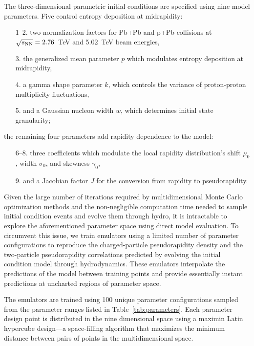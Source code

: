 The three-dimensional parametric initial conditions are specified using nine model parameters.
Five control entropy deposition at midrapidity:
\begin{itemize}[itemsep=0pt]
  \item[1--2.] two normalization factors for Pb+Pb and p+Pb collisions at $\sqrt{s_\mathrm{NN}}=2.76$~TeV and 5.02~TeV beam energies,
  \item[3.] the generalized mean parameter $p$ which modulates entropy deposition at midrapidity,
  \item[4.] a gamma shape parameter $k$, which controls the variance of proton-proton multiplicity fluctuations,
  \item[5.] and a Gaussian nucleon width $w$, which determines initial state granularity;
\end{itemize}
the remaining four parameters add rapidity dependence to the model:
\begin{itemize}[itemsep=0pt]
  \setcounter{enumi}{6}
  \item[6--8.] three coefficients which modulate the local rapidity distribution's shift $\mu_0$, width $\sigma_0$, and skewness $\gamma_0$,
  \item[9.] and a Jacobian factor $J$ for the conversion from rapidity to pseudorapidity.
\end{itemize}

Given the large number of iterations required by multidimensional Monte Carlo optimization methods and the non-negligible computation time needed to sample initial condition events and evolve them through hydro, it is intractable to explore the aforementioned parameter space using direct model evaluation.
To circumvent this issue, we train emulators using a limited number of parameter configurations to reproduce the charged-particle pseudorapidity density and the two-particle pseudorapidity correlations predicted by evolving the initial condition model through hydrodynamics.
These emulators interpolate the predictions of the model between training points and provide essentially instant predictions at uncharted regions of parameter space.

The emulators are trained using 100 unique parameter configurations sampled from the parameter ranges listed in Table~\ref{tab:parameters}.
Each parameter design point is distributed in the nine dimensional space using a maximin Latin hypercube design---a space-filling algorithm that maximizes the minimum distance between pairs of points in the multidimensional space.

